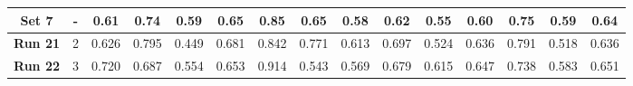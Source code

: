 \begin{table}[!ht]
{\begin{tabular}{|c|c|ccc|ccc|ccc|c|c|c|c|}
			
			\hline
			
			\textbf{Set 7} & - & \multicolumn{1}{c|}{0.61} & \multicolumn{1}{c|}{0.74} & 0.59 & \multicolumn{1}{c|}{0.65} & \multicolumn{1}{c|}{0.85} & 0.65 & \multicolumn{1}{c|}{0.58} & \multicolumn{1}{c|}{0.62} & 0.55 & 0.60 & 0.75 & 0.59 & 0.64 \\

			\hline
			\hline
			
			\textbf{Run 21} & 2 & \multicolumn{1}{c|}{0.626} & \multicolumn{1}{c|}{0.795} & 0.449 & \multicolumn{1}{c|}{0.681} & \multicolumn{1}{c|}{0.842} & 0.771 & \multicolumn{1}{c|}{0.613} & \multicolumn{1}{c|}{0.697} & 0.524 & 0.636 & 0.791 & 0.518 & 0.636 \\
			
			
			\textbf{Run 22} & 3 & \multicolumn{1}{c|}{0.720} & \multicolumn{1}{c|}{0.687} & 0.554 & \multicolumn{1}{c|}{0.653} & \multicolumn{1}{c|}{0.914} & 0.543 & \multicolumn{1}{c|}{0.569} & \multicolumn{1}{c|}{0.679} & 0.615 & 0.647 & 0.738 & 0.583 & 0.651 \\
			
			
			\hline
			
	\end{tabular}}
	\label{tab:Experiment1.3SevenPatches5DegreeRotationFluid}
\end{table}

